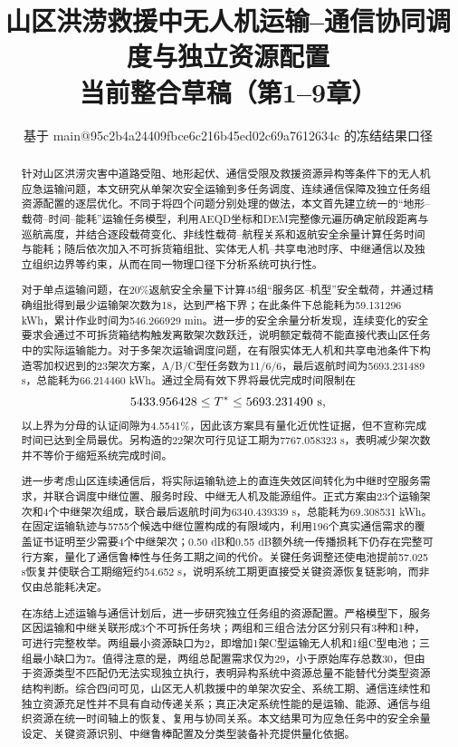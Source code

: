 \documentclass[UTF8,a4paper,12pt]{ctexart}
\title{山区洪涝救援中无人机运输--通信协同调度与独立资源配置\\
\large 当前整合草稿（第1--9章）}
\author{}
\date{基于 main@95c2b4a24409fbce6c216b45ed02c69a7612634c 的冻结结果口径}
\begin{document}
\maketitle


\begin{abstract}
针对山区洪涝灾害中道路受阻、地形起伏、通信受限及救援资源异构等条件下的无人机应急运输问题，本文研究从单架次安全运输到多任务调度、连续通信保障及独立任务组资源配置的逐层优化。不同于将四个问题分别处理的做法，本文首先建立统一的“地形--载荷--时间--能耗”运输任务模型，利用AEQD坐标和DEM完整像元遍历确定航段距离与巡航高度，并结合逐段载荷变化、非线性载荷--航程关系和返航安全余量计算任务时间与能耗；随后依次加入不可拆货箱组批、实体无人机--共享电池时序、中继通信以及独立组织边界等约束，从而在同一物理口径下分析系统可执行性。

对于单点运输问题，在20\%返航安全余量下计算45组“服务区--机型”安全载荷，并通过精确组批得到最少运输架次数为18，达到严格下界；在此条件下总能耗为59.131296 kWh，累计作业时间为546.266929 min。进一步的安全余量分析发现，连续变化的安全要求会通过不可拆货箱结构触发离散架次数跃迁，说明额定载荷不能直接代表山区任务中的实际运输能力。对于多架次运输调度问题，在有限实体无人机和共享电池条件下构造零加权迟到的23架次方案，A/B/C型任务数为11/6/6，最后返航时间为5693.231489 s，总能耗为66.214460 kWh。通过全局有效下界将最优完成时间限制在
\[
5433.956428\le T^*\le5693.231490\ {\rm s},
\]
以上界为分母的认证间隙为4.5541\%，因此该方案具有量化近优性证据，但不宣称完成时间已达到全局最优。另构造的22架次可行见证工期为7767.058323 s，表明减少架次数并不等价于缩短系统完成时间。

进一步考虑山区连续通信后，将实际运输轨迹上的直连失效区间转化为中继时空服务需求，并联合调度中继位置、服务时段、中继无人机及能源组件。正式方案由23个运输架次和4个中继架次组成，联合最后返航时间为6340.439339 s，总能耗为69.308531 kWh。在固定运输轨迹与5755个候选中继位置构成的有限域内，利用196个真实通信需求的覆盖证书证明至少需要4个中继架次；0.50 dB和0.55 dB额外统一传播损耗下仍存在完整可行方案，量化了通信鲁棒性与任务工期之间的代价。关键任务调整还使电池提前57.025 s恢复并使联合工期缩短约54.652 s，说明系统工期更直接受关键资源恢复链影响，而非仅由总能耗决定。

在冻结上述运输与通信计划后，进一步研究独立任务组的资源配置。严格模型下，服务区因运输和中继关联形成3个不可拆任务块；两组和三组合法分区分别只有3种和1种，可进行完整枚举。两组最小资源缺口为2，即增加1架C型运输无人机和1组C型电池；三组最小缺口为7。值得注意的是，两组总配置需求仅为29，小于原始库存总数30，但由于资源类型不匹配仍无法实现独立执行，表明异构系统中资源总量不能替代分类型资源结构判断。综合四问可见，山区无人机救援中的单架次安全、系统工期、通信连续性和独立资源充足性并不具有自动传递关系；真正决定系统性能的是运输、能源、通信与组织资源在统一时间轴上的恢复、复用与协同关系。本文结果可为应急任务中的安全余量设定、关键资源识别、中继鲁棒配置及分类型装备补充提供量化依据。
\end{abstract}
\end{document}
